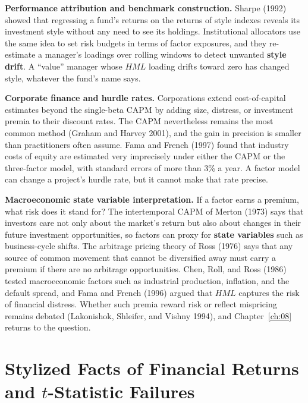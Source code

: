 \textbf{Performance attribution and benchmark construction.} Sharpe (1992) showed that regressing a fund's returns on the returns of style indexes reveals its investment style without any need to see its holdings. Institutional allocators use the same idea to set risk budgets in terms of factor exposures, and they re-estimate a manager's loadings over rolling windows to detect unwanted \textbf{style drift}. A ``value'' manager whose $HML$ loading drifts toward zero has changed style, whatever the fund's name says.

\textbf{Corporate finance and hurdle rates.} Corporations extend cost-of-capital estimates beyond the single-beta CAPM by adding size, distress, or investment premia to their discount rates. The CAPM nevertheless remains the most common method (Graham and Harvey 2001), and the gain in precision is smaller than practitioners often assume. Fama and French (1997) found that industry costs of equity are estimated very imprecisely under either the CAPM or the three-factor model, with standard errors of more than 3\% a year. A factor model can change a project's hurdle rate, but it cannot make that rate precise.

\textbf{Macroeconomic state variable interpretation.} If a factor earns a premium, what risk does it stand for? The intertemporal CAPM of Merton (1973) says that investors care not only about the market's return but also about changes in their future investment opportunities, so factors can proxy for \textbf{state variables} such as business-cycle shifts. The arbitrage pricing theory of Ross (1976) says that any source of common movement that cannot be diversified away must carry a premium if there are no arbitrage opportunities. Chen, Roll, and Ross (1986) tested macroeconomic factors such as industrial production, inflation, and the default spread, and Fama and French (1996) argued that $HML$ captures the risk of financial distress. Whether such premia reward risk or reflect mispricing remains debated (Lakonishok, Shleifer, and Vishny 1994), and Chapter~\ref{ch:08} returns to the question.

\section{Stylized Facts of Financial Returns and $t$-Statistic Failures}
\label{sec:03-facts}

